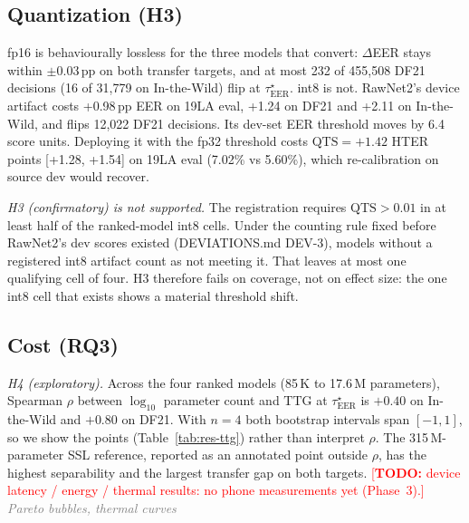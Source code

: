 \documentclass[journal]{IEEEtran}
\newcommand{\todo}[1]{\textcolor{red}{[\textbf{TODO:} #1]}}
\newcommand{\placeholder}[1]{\textcolor{gray}{\emph{#1}}}
\newcommand{\ttg}{\mathrm{TTG}}
\newcommand{\qts}{\mathrm{QTS}}
\newcommand{\eer}{\mathrm{EER}}
\newcommand{\taustar}{\tau^{\star}}
\begin{document}
\subsection{Quantization (H3)}
\label{sec:res-quant}
fp16 is behaviourally lossless for the three models that convert: \(\Delta\)EER
stays within \(\pm0.03\)\,pp on both transfer targets, and at most 232 of
455,508 DF21 decisions (16 of 31,779 on In-the-Wild) flip at
\(\taustar_{\eer}\). int8 is not. RawNet2's device artifact costs +0.98\,pp EER
on 19LA eval, +1.24 on DF21 and +2.11 on In-the-Wild, and flips 12,022 DF21
decisions. Its dev-set EER threshold moves by 6.4 score units. Deploying it with
the fp32 threshold costs \(\qts=+1.42\) HTER points [+1.28, +1.54] on 19LA eval
(7.02\% vs 5.60\%), which re-calibration on source dev would recover.

\emph{H3 (confirmatory) is not supported.} The registration requires
\(\qts>0.01\) in at least half of the ranked-model int8 cells. Under the
counting rule fixed before RawNet2's dev scores existed (DEVIATIONS.md DEV-3),
models without a registered int8 artifact count as not meeting it. That leaves
at most one qualifying cell of four. H3 therefore fails on coverage, not on
effect size: the one int8 cell that exists shows a material threshold shift.

\subsection{Cost (RQ3)}
\label{sec:res-cost}
\emph{H4 (exploratory).} Across the four ranked models (85\,K to 17.6\,M
parameters), Spearman \(\rho\) between \(\log_{10}\) parameter count and
\(\ttg\) at \(\taustar_{\eer}\) is \(+0.40\) on In-the-Wild and \(+0.80\) on
DF21. With \(n{=}4\) both bootstrap intervals span \([-1,1]\), so we show the
points (Table~\ref{tab:res-ttg}) rather than interpret \(\rho\). The
315\,M-parameter SSL reference, reported as an annotated point outside
\(\rho\), has the highest separability and the largest transfer gap on both
targets. \todo{device latency / energy / thermal results: no phone
measurements yet (Phase~3).} \placeholder{Pareto bubbles, thermal curves}
\end{document}
